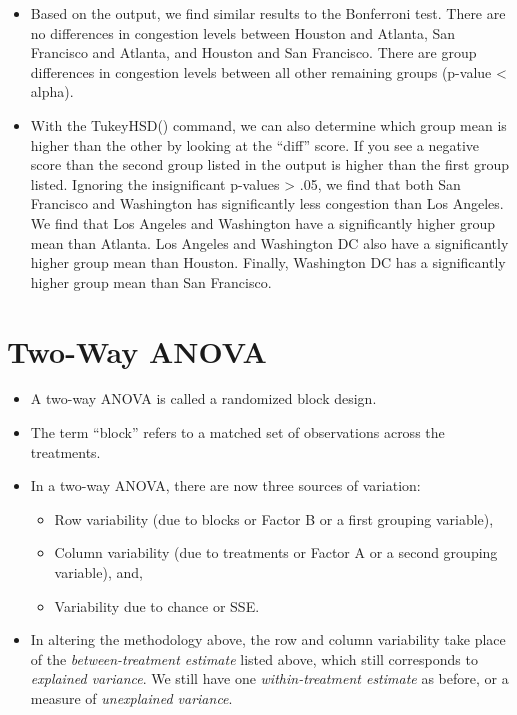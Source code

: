 \documentclass[
  letterpaper,
  DIV=11,
  numbers=noendperiod]{scrreprt}
\providecommand{\tightlist}{%
  \setlength{\itemsep}{0pt}\setlength{\parskip}{0pt}}\usepackage{longtable,booktabs,array}
\begin{document}
\begin{itemize}
\item
  Based on the output, we find similar results to the Bonferroni test.
  There are no differences in congestion levels between Houston and
  Atlanta, San Francisco and Atlanta, and Houston and San Francisco.
  There are group differences in congestion levels between all other
  remaining groups (p-value \textless{} alpha).
\item
  With the TukeyHSD() command, we can also determine which group mean is
  higher than the other by looking at the ``diff'' score. If you see a
  negative score than the second group listed in the output is higher
  than the first group listed. Ignoring the insignificant p-values
  \textgreater{} .05, we find that both San Francisco and Washington has
  significantly less congestion than Los Angeles. We find that Los
  Angeles and Washington have a significantly higher group mean than
  Atlanta. Los Angeles and Washington DC also have a significantly
  higher group mean than Houston. Finally, Washington DC has a
  significantly higher group mean than San Francisco.
\end{itemize}


\chapter{Two-Way ANOVA}\label{two-way-anova}

\begin{itemize}
\tightlist
\item
  A two-way ANOVA is called a randomized block design.
\item
  The term ``block'' refers to a matched set of observations across the
  treatments.
\item
  In a two-way ANOVA, there are now three sources of variation:

  \begin{itemize}
  \tightlist
  \item
    Row variability (due to blocks or Factor B or a first grouping
    variable),
  \item
    Column variability (due to treatments or Factor A or a second
    grouping variable), and,
  \item
    Variability due to chance or SSE.
  \end{itemize}
\item
  In altering the methodology above, the row and column variability take
  place of the \emph{between-treatment estimate} listed above, which
  still corresponds to \emph{explained variance}. We still have one
  \emph{within-treatment estimate} as before, or a measure of
  \emph{unexplained variance}.
\end{itemize}
\end{document}
